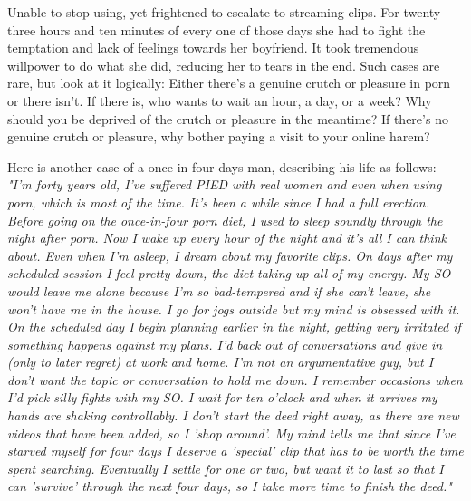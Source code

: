 \documentclass[easypeasy]{subfiles}
\begin{document}
Unable to stop using, yet frightened to escalate to streaming clips. For twenty-three hours and ten minutes of every one of those days she had to fight the temptation and lack of feelings towards her boyfriend. It took tremendous willpower to do what she did, reducing her to tears in the end. Such cases are rare, but look at it logically: Either there's a genuine crutch or pleasure in porn or there isn't. If there is, who wants to wait an hour, a day, or a week? Why should you be deprived of the crutch or pleasure in the meantime? If there's no genuine crutch or pleasure, why bother paying a visit to your online harem?

  Here is another case of a once-in-four-days man, describing his life as follows:\\

  \textit{"I'm forty years old, I've suffered PIED with real women and even when using porn, which is most of the time. It's been a while since I had a full erection. Before going on the once-in-four porn diet, I used to sleep soundly through the night after porn. Now I wake up every hour of the night and it's all I can think about. Even when I'm asleep, I dream about my favorite clips. On days after my scheduled session I feel pretty down, the diet taking up all of my energy. My SO would leave me alone because I'm so bad-tempered and if she can't leave, she won't have me in the house. I go for jogs outside but my mind is obsessed with it. On the scheduled day I begin planning earlier in the night, getting very irritated if something happens against my plans. I'd back out of conversations and give in (only to later regret) at work and home. I'm not an argumentative guy, but I don't want the topic or conversation to hold me down. I remember occasions when I'd pick silly fights with my SO. I wait for ten o'clock and when it arrives my hands are shaking controllably. I don't start the deed right away, as there are new videos that have been added, so I 'shop around'. My mind tells me that since I've starved myself for four days I deserve a 'special' clip that has to be worth the time spent searching. Eventually I settle for one or two, but want it to last so that I can 'survive' through the next four days, so I take more time to finish the deed."}\\
\end{document}
